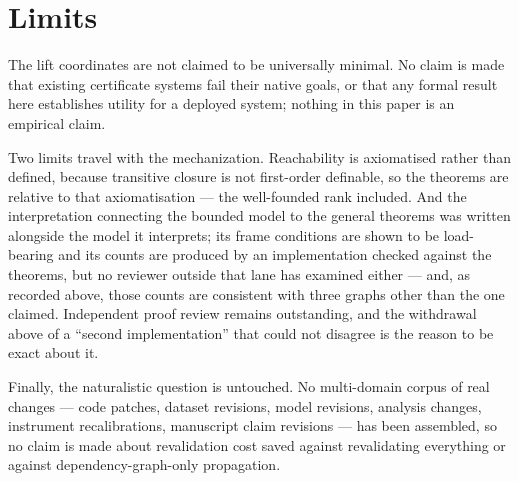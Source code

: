 \section{Limits}

The lift coordinates are not claimed to be universally minimal. No claim is made
that existing certificate systems fail their native goals, or that any formal
result here establishes utility for a deployed system; nothing in this paper is
an empirical claim.

Two limits travel with the mechanization. Reachability is axiomatised rather
than defined, because transitive closure is not first-order definable, so the
theorems are relative to that axiomatisation --- the well-founded rank included.
And the interpretation connecting the bounded model to the general theorems was
written alongside the model it interprets; its frame conditions are shown to be
load-bearing and its counts are produced by an implementation checked against
the theorems, but no reviewer outside that lane has examined either --- and, as
recorded above, those counts are consistent with three graphs other than the one
claimed. Independent
proof review remains outstanding, and the withdrawal above of a ``second
implementation'' that could not disagree is the reason to be exact about it.

Finally, the naturalistic question is untouched. No multi-domain corpus of real
changes --- code patches, dataset revisions, model revisions, analysis changes,
instrument recalibrations, manuscript claim revisions --- has been assembled, so
no claim is made about revalidation cost saved against revalidating everything
or against dependency-graph-only propagation.
